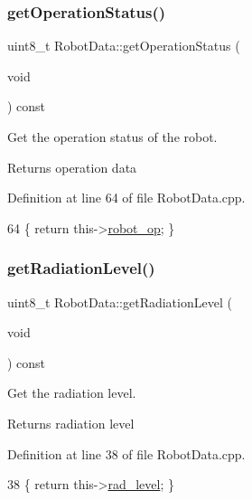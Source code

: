 \subsubsection{\texorpdfstring{get\+Operation\+Status()}{getOperationStatus()}}
{\footnotesize\ttfamily uint8\+\_\+t Robot\+Data\+::get\+Operation\+Status (\begin{DoxyParamCaption}\item[{void}]{ }\end{DoxyParamCaption}) const}



Get the operation status of the robot. 

\begin{DoxyReturn}{Returns}
operation data 
\end{DoxyReturn}


Definition at line 64 of file Robot\+Data.\+cpp.


\begin{DoxyCode}
64 \{ \textcolor{keywordflow}{return} this->\hyperlink{class_robot_data_aa8c48e89aac7db2af1db825a7f3c1f30}{robot\_op}; \}
\end{DoxyCode}
\mbox{\label{class_robot_data_a8bffbd345dfd74acedd44270133e0477}} 
\subsubsection{\texorpdfstring{get\+Radiation\+Level()}{getRadiationLevel()}}
{\footnotesize\ttfamily uint8\+\_\+t Robot\+Data\+::get\+Radiation\+Level (\begin{DoxyParamCaption}\item[{void}]{ }\end{DoxyParamCaption}) const}



Get the radiation level. 

\begin{DoxyReturn}{Returns}
radiation level 
\end{DoxyReturn}


Definition at line 38 of file Robot\+Data.\+cpp.


\begin{DoxyCode}
38 \{ \textcolor{keywordflow}{return} this->\hyperlink{class_robot_data_ad41288ab1056c14560356bf1a3e0a652}{rad\_level}; \}
\end{DoxyCode}
\mbox{\label{class_robot_data_a9e8a44387275e115f71713210c8b0841}} 

